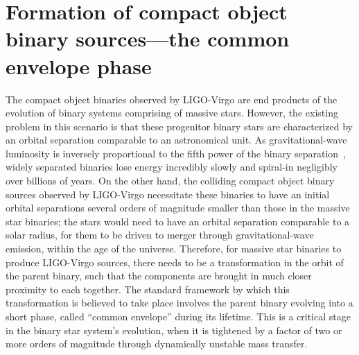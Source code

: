 \section{Formation of compact object binary sources---the common envelope phase}
The compact object binaries observed by LIGO-Virgo are end products of the evolution of binary systems comprising of massive stars. However, the existing problem in this scenario is that these progenitor binary stars are characterized by an orbital separation comparable to an astronomical unit. As gravitational-wave luminosity is inversely proportional to the fifth power of the binary separation~\cite{PhysRev.136.B1224}, widely separated binaries lose energy incredibly slowly and spiral-in negligibly over billions of years. On the other hand, the colliding compact object binary sources observed by LIGO-Virgo necessitate these binaries to have an initial orbital separations several orders of magnitude smaller than those in the massive star binaries; the stars would need to have an orbital separation comparable to a solar radius, for them to be driven to merger through gravitational-wave emission, within the age of the universe. Therefore, for massive star binaries to produce LIGO-Virgo sources, there needs to be a transformation in the orbit of the parent binary, such that the components are brought in much closer proximity to each together. The standard framework by which this transformation is believed to take place involves the parent binary evolving into a short phase, called ``common envelope'' during its lifetime. This is a critical stage in the binary star system's evolution, when it is tightened by a factor of two or more orders of magnitude through dynamically unstable mass transfer.

